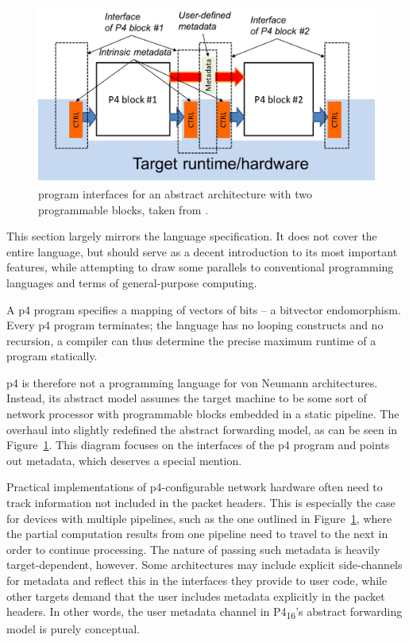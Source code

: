 \begin{figure}[t]
	\includegraphics[width=1.00\textwidth]{resources/p4_16-architecture-model.png}

	\caption{\pfs program interfaces for an abstract architecture with two
	programmable blocks, taken from \cite{p416:v123:spec}.}
	\label{fig:arch-model}
\end{figure}

This section largely mirrors the \pfs language specification. It does not cover
the entire language, but should serve as a decent introduction to its most
important features, while attempting to draw some parallels to conventional
programming languages and terms of general-purpose computing.

A \acrshort{p4} program specifies a mapping of vectors of bits -- a bit\-vector
endomorphism. Every \acrshort{p4} program terminates; the language has no
looping constructs and no recursion, a compiler can thus determine the precise
maximum runtime of a program statically.

\acrshort{p4} is therefore not a programming language for von Neumann
architectures. Instead, its abstract model assumes the target machine to be some
sort of network processor with programmable blocks embedded in a static
pipeline. The overhaul into \pfs slightly redefined the abstract forwarding
model, as can be seen in Figure~\ref{fig:arch-model}. This diagram focuses on
the interfaces of the \acrshort{p4} program and points out metadata, which
deserves a special mention.

Practical implementations of \acrshort{p4}-configurable network hardware often
need to track information not included in the packet headers. This is especially
the case for devices with multiple pipelines, such as the one outlined in
Figure~\ref{fig:arch-model}, where the partial computation results from one
pipeline need to travel to the next in order to continue processing. The nature
of passing such metadata is heavily target-dependent, however. Some
architectures may include explicit side-channels for metadata and reflect this
in the interfaces they provide to user code, while other targets demand that the
user includes metadata explicitly in the packet headers. In other words, the
user metadata channel in P4\textsubscript{16}'s abstract forwarding model is
purely conceptual.

